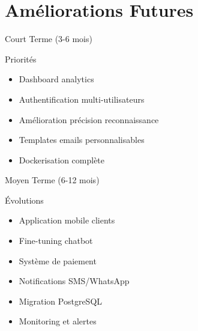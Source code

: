 \documentclass[aspectratio=169,11pt]{beamer}
\begin{document}

\section{Améliorations Futures}

\begin{frame}{Court Terme (3-6 mois)}
\begin{block}{Priorités}
\begin{itemize}
    \item[\textcolor{successgreen}{\faCheckSquare}] Dashboard analytics
    \item[\textcolor{successgreen}{\faCheckSquare}] Authentification multi-utilisateurs
    \item[\textcolor{successgreen}{\faCheckSquare}] Amélioration précision reconnaissance
    \item[\textcolor{successgreen}{\faCheckSquare}] Templates emails personnalisables
    \item[\textcolor{successgreen}{\faCheckSquare}] Dockerisation complète
\end{itemize}
\end{block}
\end{frame}

\begin{frame}{Moyen Terme (6-12 mois)}
\begin{block}{Évolutions}
\begin{itemize}
    \item[\textcolor{secondaryblue}{\faMobile}] Application mobile clients
    \item[\textcolor{secondaryblue}{\faBrain}] Fine-tuning chatbot
    \item[\textcolor{secondaryblue}{\faCreditCard}] Système de paiement
    \item[\textcolor{secondaryblue}{\faSms}] Notifications SMS/WhatsApp
    \item[\textcolor{secondaryblue}{\faDatabase}] Migration PostgreSQL
    \item[\textcolor{secondaryblue}{\faChartLine}] Monitoring et alertes
\end{itemize}
\end{block}
\end{frame}
\end{document}
